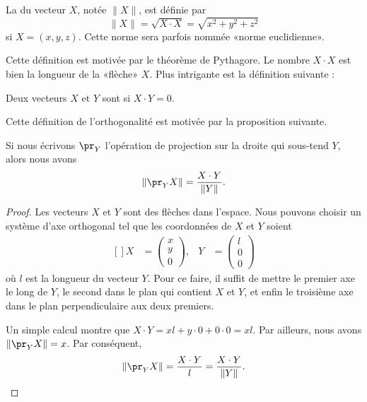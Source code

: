 \begin{definition}
	La  du vecteur $X$, notée $\| X \|$, est définie par 
	\begin{equation}
		\| X \|=\sqrt{X\cdot X}=\sqrt{x^2+y^2+z^2}
	\end{equation}
	si $X=(x,y,z)$. Cette norme sera parfois nommée «norme euclidienne».
\end{definition}
Cette définition est motivée par le théorème de Pythagore. Le nombre $X\cdot X$ est bien la longueur de la «flèche» $X$. Plus intrigante est la définition suivante :
\begin{definition}
	Deux vecteurs $X$ et $Y$ sont  si $X\cdot Y=0$. 
\end{definition}
Cette définition de l'orthogonalité est motivée par la proposition suivante.

\begin{proposition}		\label{PropProjScal}
	Si nous écrivons $\pr_Y$  l'opération de projection sur la droite qui sous-tend $Y$, alors nous avons
	\begin{equation}
		\| \pr_YX \|=\frac{ X\cdot Y }{ \| Y \| }.
	\end{equation}
\end{proposition}

\begin{proof}
	Les vecteurs $X$ et $Y$ sont des flèches dans l'espace. Nous pouvons choisir un système d'axe orthogonal tel que les coordonnées de $X$ et $Y$ soient
	\begin{equation}
		\begin{aligned}[]
			X&=\begin{pmatrix}
				x	\\ 
				y	\\ 
				0	
			\end{pmatrix},
			&Y&=\begin{pmatrix}
				l	\\ 
				0	\\ 
				0	
			\end{pmatrix}
		\end{aligned}
	\end{equation}
	où $l$ est la longueur du vecteur $Y$. Pour ce faire, il suffit de mettre le premier axe le long de $Y$, le second dans le plan qui contient $X$ et $Y$, et enfin le troisième axe dans le plan perpendiculaire aux deux premiers.

	Un simple calcul montre que $X\cdot Y=xl+y\cdot 0+0\cdot 0=xl$. Par ailleurs, nous avons $\| \pr_YX \|=x$. Par conséquent,
	\begin{equation}
		\| \pr_YX \|=\frac{ X\cdot Y }{ l }=\frac{ X\cdot Y }{ \| Y \| }.
	\end{equation}
\end{proof}

